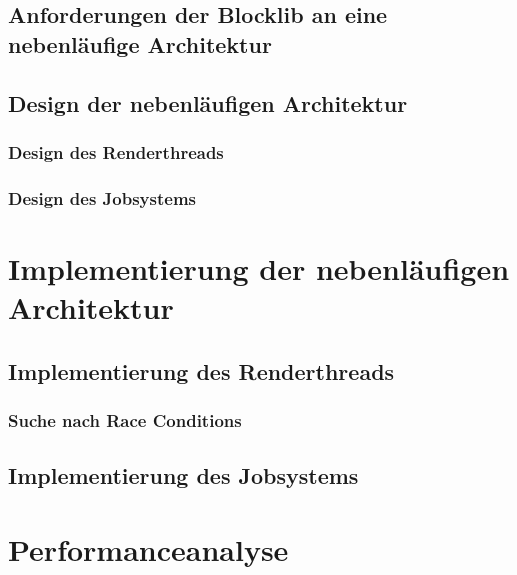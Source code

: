 \documentclass[12pt,a4paper,listof=toc,parskip=half,numbers=noenddot,abstract=true]{scrartcl}
\begin{document}
\subsection{Anforderungen der Blocklib an eine nebenläufige Architektur}\label{sec:anforderungen}


\subsection{Design der nebenläufigen Architektur}

\subsubsection{Design des Renderthreads}\label{sec:desgignRenderthread}

\subsubsection{Design des Jobsystems}\label{sec:desgignJobsystem}


\pagebreak
\section{Implementierung der nebenläufigen Architektur}\label{kap:Implementierung}

\subsection{Implementierung des Renderthreads}


\subsubsection{Suche nach Race Conditions}\label{sec:searchRace}

\subsection{Implementierung des Jobsystems}


\clearpage
\section{Performanceanalyse}\label{kap:performance}

\end{document}
